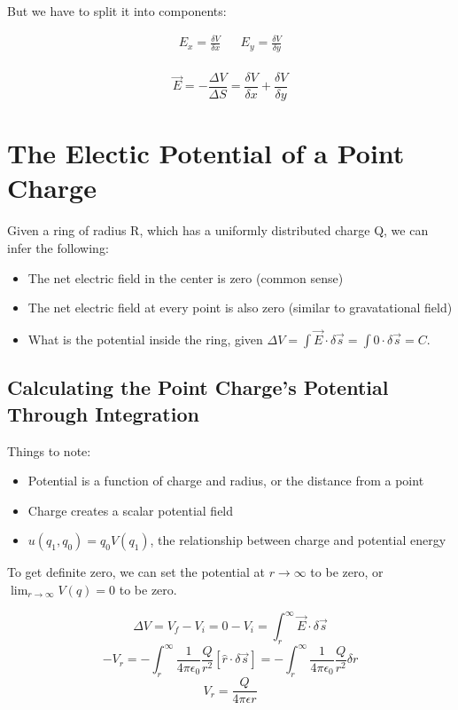 \documentclass{article}
\begin{document}
But we have to split it into components:

\begin{align*}
    E_x = \frac{\delta V}{\delta x} &  & E_y = \frac{\delta V}{ \delta y} \\
\end{align*}

$$  \vec{E} = - \frac{\Delta V}{\Delta S} = \frac{\delta V}{\delta x} + \frac{\delta V}{\delta y}$$

\section{The Electic Potential of a Point Charge}

Given a ring of radius R, which has a uniformly distributed charge Q, we can infer the following:

\begin{itemize}
    \item The net electric field in the center is zero (common sense)
    \item The net electric field at every point is also zero (similar to gravatational field)
    \item What is the potential inside the ring, given $\Delta V = \int \vec{E} \cdot \delta \vec{s} = \int 0 \cdot \delta \vec{s} = \boxed{C}$.
\end{itemize}

\subsection{Calculating the Point Charge's Potential Through Integration}
Things to note:
\begin{itemize}
    \item Potential is a function of charge and radius, or the distance from a point
    \item Charge creates a scalar potential field
    \item $u(q_1, q_0) = q_0 V (q_1)$, the relationship between charge and potential energy
\end{itemize}

To get definite zero, we can set the potential at $r \to \infty$ to be zero, or $\lim_{r \to \infty} V(q) = 0$ to be zero.

$$\Delta V = V_f - V_i = 0 - V_i = \int_{r}^{\infty} \vec{E} \cdot \delta \vec{s}$$
$$- V_r = -\int_{r}^{\infty} \frac{1}{4\pi\epsilon_0} \frac{Q}{r^2} \left[\hat{r} \cdot \delta \vec{s}\right] = -\int_{r}^{\infty} \frac{1}{4\pi\epsilon_0} \frac{Q}{r^2} \delta r$$
$$\boxed{V_r = \frac{Q}{4\pi\epsilon r}}$$
\end{document}
